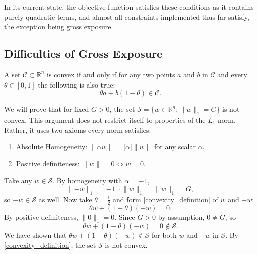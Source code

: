 \documentclass[11pt, letterpaper]{article}
\begin{document}
In its current state, the objective function satisfies these conditions as it contains purely quadratic terms, and almost all constraints
implemented thus far satisfy, the exception being gross exposure.

\subsection{Difficulties of Gross Exposure}
\label{gross_exposure_section}
A set $\mathcal{C} \subset \mathds{R}^n$ is convex if and only if for any two points $a$ and $b$ in $\mathcal{C}$ and every
$\theta \in [0,1]$ the following is also true:
\begin{equation}
    \label{convexity_definition}
	\theta a + b (1 - \theta) \in \mathcal{C}.
\end{equation}

We will prove that for fixed $G > 0$, the set $\mathcal{S} = \{w\in \mathds{R}^n:\lVert w\rVert_1 = G\}$ is not convex.
This argument does not restrict itself to properties of the $L_1$ norm. Rather, it uses two axioms every norm satisfies:
\begin{enumerate}
	\item Absolute Homogeneity: $\lVert\alpha w\rVert = |\alpha| \lVert w\rVert$ for any scalar $\alpha$.
	\item Positive definiteness: $\lVert w\rVert = 0 \Leftrightarrow w = 0$.
\end{enumerate}
Take any $w \in \mathcal{S}$. By homogeneity with $\alpha = -1$,
\begin{equation*}
	\lVert-w\rVert_1 = | -1|\cdot \lVert w\rVert_1 = \lVert w\rVert_1 = G,
\end{equation*}
so $-w \in \mathcal{S}$ as well. Now take $\theta = \frac{1}{2}$ and form \eqref{convexity_definition} of $w$ and $-w$:
\begin{equation*}
	\theta w + (1-\theta)(-w) = 0.
\end{equation*}
By positive definiteness, $\lVert 0\rVert_1 = 0$. Since $G>0$ by assumption, $0 \neq G$, so
\begin{equation*}
	\theta w + (1-\theta)(-w) = 0 \notin \mathcal{S}.
\end{equation*}
We have shown that $\theta w + (1 - \theta) (-w) \notin \mathcal{S}$ for both $w$ and $-w$ in $\mathcal{S}$.
By \eqref{convexity_definition}, the set $\mathcal{S}$ is not convex.
\end{document}
